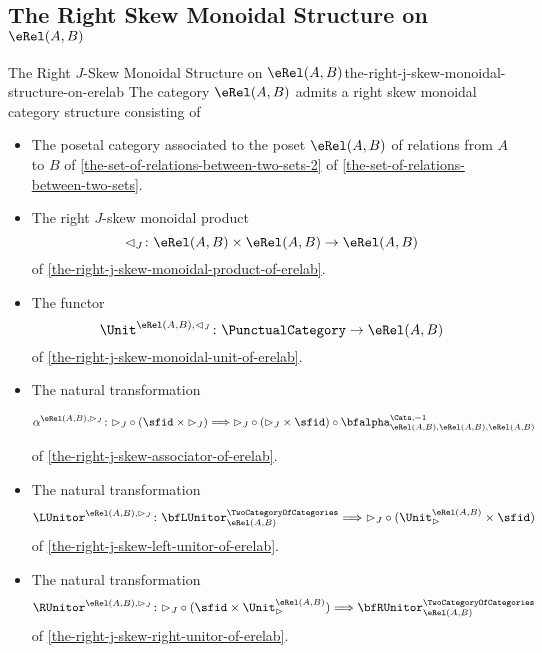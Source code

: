 \subsection{The Right Skew Monoidal Structure on $\eRel(A,B)$}\label{subsection-the-right-skew-monoidal-structure-on-rel-a-b}
\begin{proposition}{The Right $J$-Skew Monoidal Structure on $\eRel(A,B)$}{the-right-j-skew-monoidal-structure-on-erelab}%
    The category $\eRel(A,B)$ admits a right skew monoidal category structure consisting of%
    \begin{itemize}
        \item{}The posetal category associated to the poset $\eRel(A,B)$ of relations from $A$ to $B$ of \cref{the-set-of-relations-between-two-sets-2} of \cref{the-set-of-relations-between-two-sets}.
        \item{}The right $J$-skew monoidal product
            \[
                \lhd_{J}%
                \colon%
                \eRel(A,B)\times\eRel(A,B)%
                \to%
                \eRel(A,B)
            \]%
            of \cref{the-right-j-skew-monoidal-product-of-erelab}.
        \item{}The functor
            \[
                \Unit^{\eRel(A,B),\lhd_{J}}
                \colon
                \PunctualCategory
                \to
                \eRel(A,B)
            \]
            of \cref{the-right-j-skew-monoidal-unit-of-erelab}.
        \item{}The natural transformation
            \begin{envsmallsize}
                \[
                    \alpha^{\eRel(A,B),\rhd_{J}}%
                    \colon%
                    {\rhd_{J}}\circ{(\sfid\times{\rhd_{J}})}%
                    \Longrightarrow%
                    {\rhd_{J}}\circ{({\rhd_{J}}\times\sfid)}\circ{\bfalpha^{\Cats,-1}_{\eRel(A,B),\eRel(A,B),\eRel(A,B)}}%
                \]
            \end{envsmallsize}
            of \cref{the-right-j-skew-associator-of-erelab}.
        \item{}The natural transformation
            \[
                \LUnitor^{\eRel(A,B),\rhd_{J}}
                \colon
                \bfLUnitor^{\TwoCategoryOfCategories}_{\eRel(A,B)}
                \Longrightarrow
                {\rhd_{J}}\circ{(\Unit^{\eRel(A,B)}_{\rhd}\times\sfid)}
            \]
            of \cref{the-right-j-skew-left-unitor-of-erelab}.
        \item{}The natural transformation
            \[
                \RUnitor^{\eRel(A,B),\rhd_{J}}
                \colon
                {\rhd_{J}}\circ{(\sfid\times\Unit^{\eRel(A,B)}_{\rhd})}
                \Longrightarrow
                \bfRUnitor^{\TwoCategoryOfCategories}_{\eRel(A,B)}
            \]
            of \cref{the-right-j-skew-right-unitor-of-erelab}.
    \end{itemize}
\end{proposition}
